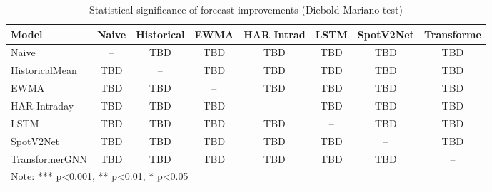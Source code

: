 \documentclass[journal]{IEEEtran}
\begin{document}
\begin{table}[!t]
\centering
\caption{Statistical significance of forecast improvements (Diebold-Mariano test)}
\label{tab:statistical_tests}
\begin{tabular}{lccccccc}
\toprule
Model & Naive & Historical & EWMA & HAR Intrad & LSTM & SpotV2Net & Transforme \\
\midrule
Naive & -- & TBD & TBD & TBD & TBD & TBD & TBD \\
HistoricalMean & TBD & -- & TBD & TBD & TBD & TBD & TBD \\
EWMA & TBD & TBD & -- & TBD & TBD & TBD & TBD \\
HAR Intraday & TBD & TBD & TBD & -- & TBD & TBD & TBD \\
LSTM & TBD & TBD & TBD & TBD & -- & TBD & TBD \\
SpotV2Net & TBD & TBD & TBD & TBD & TBD & -- & TBD \\
TransformerGNN & TBD & TBD & TBD & TBD & TBD & TBD & -- \\
\bottomrule
\multicolumn{8}{l}{\footnotesize Note: *** p<0.001, ** p<0.01, * p<0.05}
\end{tabular}
\end{table}
\end{document}
